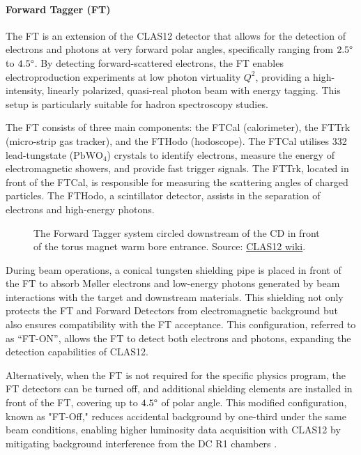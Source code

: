 \paragraph{Forward Tagger (FT)}
    The FT is an extension of the CLAS12 detector that allows for the detection of electrons and photons at very forward polar angles, specifically ranging from $2.5\degree$ to $4.5\degree$.
    By detecting forward-scattered electrons, the FT enables electroproduction experiments at low photon virtuality $Q^2$, providing a high-intensity, linearly polarized, quasi-real photon beam with energy tagging.
    This setup is particularly suitable for hadron spectroscopy studies.

    The FT consists of three main components: the FTCal (calorimeter), the FTTrk (micro-strip gas tracker), and the FTHodo (hodoscope).
    The FTCal utilises 332 lead-tungstate ($\text{PbWO}_4$) crystals to identify electrons, measure the energy of electromagnetic showers, and provide fast trigger signals.
    The FTTrk, located in front of the FTCal, is responsible for measuring the scattering angles of charged particles.
    The FTHodo, a scintillator detector, assists in the separation of electrons and high-energy photons.

        \begin{wrapfigure}{l}{0.50\textwidth}
            \centering{}
            \caption[FT]{The Forward Tagger system circled downstream of the CD in front of the torus magnet warm bore entrance.
            Source: \hyperlink{jlab.org/physics/hall-b/clas12}{CLAS12 wiki}.}
            \label{fig::ft}
        \end{wrapfigure}

    During beam operations, a conical tungsten shielding pipe is placed in front of the FT to absorb M\o ller electrons and low-energy photons generated by beam interactions with the target and downstream materials.
    This shielding not only protects the FT and Forward Detectors from electromagnetic background but also ensures compatibility with the FT acceptance.
    This configuration, referred to as ``FT-ON'', allows the FT to detect both electrons and photons, expanding the detection capabilities of CLAS12.

    Alternatively, when the FT is not required for the specific physics program, the FT detectors can be turned off, and additional shielding elements are installed in front of the FT, covering up to $4.5\degree$ of polar angle.
    This modified configuration, known as "FT-Off," reduces accidental background by one-third under the same beam conditions, enabling higher luminosity data acquisition with CLAS12 by mitigating background interference from the DC R1 chambers \cite{acker2020ft}.
